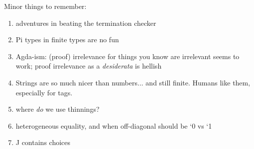 \documentclass[acmsmall,review,prologue,dvipsnames,bookmarks=false]{acmart}
\begin{document}
Minor things to remember:
\begin{enumerate}
\item adventures in beating the termination checker
\item Pi types in finite types are no fun
\item Agda-ism: (proof) irrelevance for things you know are irrelevant seems to work;
 proof irrelevance as a \emph{desiderata} is hellish
\item Strings are so much nicer than numbers... and still finite. Humans like them, especially for tags.
\item where \emph{do} we use thinnings?
\item heterogeneous equality, and when off-diagonal should be `0 vs `1
\item J contains choices
\end{enumerate}
\end{document}
